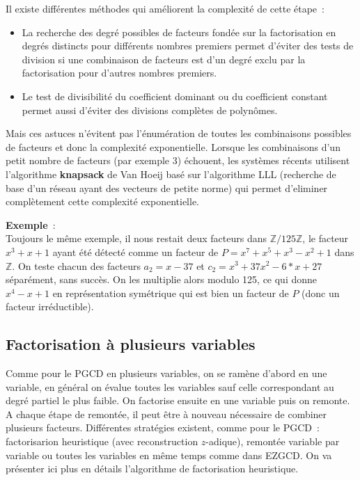\documentclass[a4paper,11pt]{article}
\begin{document}
\begin{giacjshere}
Il existe différentes méthodes
qui améliorent la complexité de cette étape~:
\begin{itemize}
\item La recherche des degré possibles de facteurs fondée sur
la factorisation en degrés distincts pour différents nombres premiers 
permet d'éviter des tests de division si une combinaison de facteurs
est d'un degré exclu par la factorisation pour d'autres nombres premiers.
\item Le test de divisibilité du coefficient dominant ou du coefficient
constant permet aussi d'éviter des divisions complètes de polynômes.
\end{itemize}
Mais ces astuces n'évitent pas l'énumération de toutes les combinaisons
possibles de facteurs et donc la complexité exponentielle. Lorsque
les combinaisons d'un petit nombre de facteurs (par exemple 3)
échouent, les systèmes récents utilisent
l'algorithme {\bf knapsack} de Van Hoeij basé sur l'algorithme LLL
(recherche de base d'un réseau ayant des vecteurs de petite norme) 
qui permet d'eliminer complètement cette complexité exponentielle.

{\bf Exemple}~:\\ 
Toujours le même exemple, il nous restait deux
facteurs dans $\mathbb{Z}/125 \mathbb{Z}$, le facteur $x^3+x+1$ ayant été
détecté comme un facteur de $P=x^7+x^5+x^3-x^2+1$ dans $\mathbb{Z}$.
On teste chacun des facteurs  $a_2=x-37$ et $c_2=x^3+37x^2-6*x+27$
séparément, sans succès. On les multiplie alors modulo 125,
ce qui donne $x^4-x+1$ en représentation symétrique qui est bien
un facteur de $P$ (donc un facteur irréductible).

\subsection{Factorisation à plusieurs variables}
Comme pour le PGCD en plusieurs variables, on se ramène d'abord en
une variable, en général on évalue toutes les variables sauf celle
correspondant au degré partiel le plus faible. On factorise ensuite
en une variable puis on remonte. A chaque étape de remontée, il peut
être à nouveau nécessaire de combiner plusieurs facteurs. Différentes
stratégies existent, comme pour le PGCD~: factorisarion heuristique
(avec reconstruction $z$-adique), remontée variable par variable
ou toutes les variables en même temps comme dans EZGCD.
On va présenter ici plus en détails l'algorithme de factorisation heuristique.


\end{giacjshere}
\end{document}
